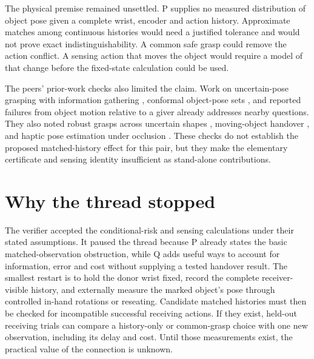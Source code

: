 \documentclass{article}
\begin{document}
The physical premise remained unsettled. P supplies no measured distribution of object pose given a
complete wrist, encoder and action history. Approximate matches among continuous histories would need a
justified tolerance and would not prove exact indistinguishability. A common safe grasp could remove the
action conflict. A sensing action that moves the object would require a model of that change before the
fixed-state calculation could be used.

The peers' prior-work checks also limited the claim. Work on uncertain-pose grasping with information
gathering \cite{hsiao2011}, conformal object-pose sets \cite{yang2023}, and reported failures from object
motion relative to a giver \cite{handover2025} already addresses nearby questions. They also noted robust
grasps across uncertain shapes \cite{lundell2019}, moving-object handover \cite{zhang2023}, and haptic
pose estimation under occlusion \cite{azulay2022}. These checks do not establish the proposed
matched-history effect for this pair, but they make the elementary certificate and sensing identity
insufficient as stand-alone contributions.

\section{Why the thread stopped}

The verifier accepted the conditional-risk and sensing calculations under their stated assumptions. It
paused the thread because P already states the basic matched-observation obstruction, while Q adds useful
ways to account for information, error and cost without supplying a tested handover result. The smallest
restart is to hold the donor wrist fixed, record the complete receiver-visible history, and externally
measure the marked object's pose through controlled in-hand rotations or reseating. Candidate matched
histories must then be checked for incompatible successful receiving actions. If they exist, held-out
receiving trials can compare a history-only or common-grasp choice with one new observation, including
its delay and cost. Until those measurements exist, the practical value of the connection is unknown.

\clearpage


\end{document}
